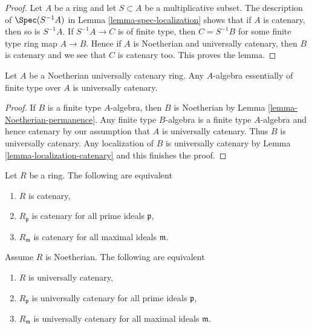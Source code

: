 \begin{proof}
Let $A$ be a ring and let $S \subset A$ be a multiplicative subset.
The description of $\Spec(S^{-1}A)$ in Lemma \ref{lemma-spec-localization}
shows that if $A$ is catenary, then so is $S^{-1}A$. If $S^{-1}A \to C$
is of finite type, then $C = S^{-1}B$ for some finite type ring map
$A \to B$. Hence if $A$ is Noetherian and universally catenary, then
$B$ is catenary and we see that $C$ is catenary too. This proves the lemma.
\end{proof}

\begin{lemma}
\label{lemma-universally-catenary}
Let $A$ be a Noetherian universally catenary ring.
Any $A$-algebra essentially of finite type over $A$
is universally catenary.
\end{lemma}

\begin{proof}
If $B$ is a finite type $A$-algebra, then $B$ is Noetherian
by Lemma \ref{lemma-Noetherian-permanence}. Any finite type
$B$-algebra is a finite type $A$-algebra and hence catenary
by our assumption that $A$ is universally catenary. Thus $B$
is universally catenary. Any localization of $B$ is universally
catenary by Lemma \ref{lemma-localization-catenary} and this
finishes the proof.
\end{proof}

\begin{lemma}
\label{lemma-catenary-check-local}
Let $R$ be a ring. The following are equivalent
\begin{enumerate}
\item $R$ is catenary,
\item $R_\mathfrak p$ is catenary for all prime ideals $\mathfrak p$,
\item $R_\mathfrak m$ is catenary for all maximal ideals $\mathfrak m$.
\end{enumerate}
Assume $R$ is Noetherian. The following are equivalent
\begin{enumerate}
\item $R$ is universally catenary,
\item $R_\mathfrak p$ is universally catenary for all prime ideals
$\mathfrak p$,
\item $R_\mathfrak m$ is universally catenary for all maximal ideals
$\mathfrak m$.
\end{enumerate}
\end{lemma}

